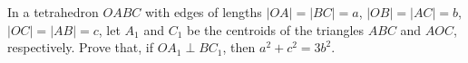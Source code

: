 In a tetrahedron $OABC$ with edges of lengths $|OA| = |BC| = a$, $|OB| = |AC| = b$, $|OC| = |AB| = c$, let $A_1$ and $C_1$ be the centroids of the triangles $ABC$ and $AOC$, respectively. Prove that, if $OA_1 \perp BC_1$, then $a^2 + c^2 = 3b^2$.
